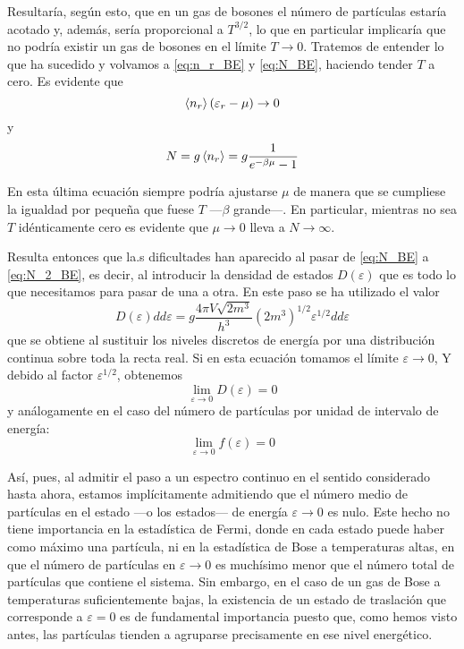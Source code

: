 Resultaría, según esto, que en un gas de bosones el número de partículas estaría acotado y, además, sería proporcional a $T^{3/2}$, lo que en particular implicaría que no podría existir un gas de bosones en el límite $T \rightarrow 0$.
Tratemos de entender lo que ha sucedido y volvamos a \eqref{eq:n_r_BE} y \eqref{eq:N_BE}, haciendo tender $T$ a cero. Es evidente que
$$\expval{n_r}(\varepsilon_r - \mu) \rightarrow 0$$
y
$$N = g\expval{n_r} = g \frac{1}{e^{-\beta\mu} - 1}$$

En esta última ecuación siempre podría ajustarse $\mu$ de manera que se cumpliese la igualdad por pequeña que fuese $T$ ---$\beta$ grande---.
En particular, mientras no sea $T$ idénticamente cero es evidente que $\mu \rightarrow 0$ lleva a $N \rightarrow \infty$.

Resulta entonces que la.s dificultades han aparecido al pasar de \eqref{eq:N_BE} a \eqref{eq:N_2_BE}, es decir, al introducir la densidad de estados $D(\varepsilon)$ que es todo lo que necesitamos para pasar de una a otra.
En este paso se ha utilizado el valor
\begin{equation}\label{eq:D_vareps_BE}
	D(\varepsilon) dd{\varepsilon} = g \frac{4\pi V\sqrt{2m^3}}{h^3} (2m^3)^{1/2} \varepsilon^{1/2} dd{\varepsilon}
\end{equation}
que se obtiene al sustituir los niveles discretos de energía por una distribución continua sobre toda la recta real.
Si en esta ecuación tomamos el límite $\varepsilon \rightarrow 0$, Y debido al factor $\varepsilon^{1/2}$, obtenemos
$$\lim\limits_{\varepsilon \rightarrow 0} D(\varepsilon) = 0$$
y análogamente en el caso del número de partículas por unidad de intervalo de energía:
$$\lim\limits_{\varepsilon \rightarrow 0} f(\varepsilon) = 0$$

Así, pues, al admitir el paso a un espectro continuo en el sentido considerado hasta ahora, estamos implícitamente admitiendo que el número medio de partículas en el estado ---o los estados--- de energía $\varepsilon \rightarrow 0$ es nulo.
Este hecho no tiene importancia en la estadística de Fermi, donde en cada estado puede haber como máximo una partícula, ni en la estadística de Bose a temperaturas altas, en que el número de partículas en $\varepsilon \rightarrow 0$ es muchísimo menor que el número total de partículas que contiene el sistema.
Sin embargo, en el caso de un gas de Bose a temperaturas suficientemente bajas, la existencia de un estado de traslación que corresponde a $\varepsilon = 0$ es de fundamental importancia puesto que, como hemos visto antes, las partículas tienden a agruparse precisamente en ese nivel energético.

